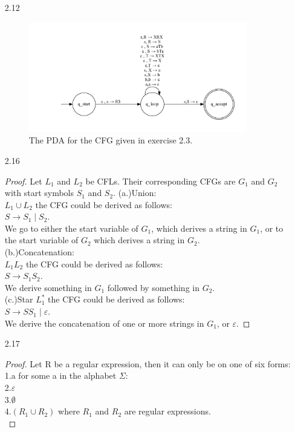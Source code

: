\documentclass[10pt] {article}
\begin{document}
\begin{enumerate}
\begin{figure}[H]
\label{7}
\end{figure}
\item[2.12]
\begin{figure}[H]
\includegraphics[width=0.9\textwidth]{a12.pdf}
\caption{The PDA for the CFG given in exercise 2.3.}
\label{8}
\end{figure}
\item[2.16]
\begin{proof}
Let $L_1$ and $L_2$ be CFLs. Their corresponding CFGs are $G_1$ and $G_2$ with start symbols $S_1$ and $S_2$.
(a.)Union:\\
$L_1 \cup L_2$ the CFG could be derived as follows:\\
$S \rightarrow S_1 \mid S_2$.\\
We go to either the start variable of $G_1$, which derives a string in $G_1$, or to the start variable of $G_2$ which derives a string in $G_2$.\\
(b.)Concatenation:\\
$L_1 L_2$ the CFG could be derived as follows:\\
$S \rightarrow S_1S_2$.\\
We derive something in $G_1$ followed by something in $G_2$.\\
(c.)Star
$L_1^{*}$ the CFG could be derived as follows:\\
$S \rightarrow SS_1 \mid \varepsilon$.\\
We derive the concatenation of one or more strings in $G_1$, or $\varepsilon$.
\end{proof}
\item[2.17]
\begin{proof}
Let R be a regular expression, then it can only be on one of six forms:\\
1.a for some a in the alphabet $\Sigma$:\\
2.$\varepsilon$\\
3.$\emptyset$\\
4.$(R_1 \cup R_2)$ where $R_1$ and $R_2$ are regular expressions. \\

\end{proof}
\end{enumerate}
\end{document}
